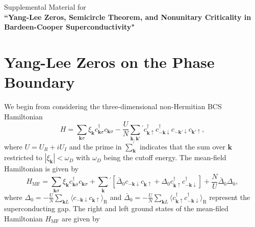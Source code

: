 \documentclass[aps,prl,twocolumn,superscriptaddress]{revtex4-1}
\begin{document}
\begin{bibunit}

\clearpage{}

\onecolumngrid
\appendix
\renewcommand{\thefigure}{S\arabic{figure}}
\setcounter{figure}{0} 
\renewcommand{\thepage}{S\arabic{page}}
\setcounter{page}{1} 
\renewcommand{\theequation}{S.\arabic{equation}}
\setcounter{equation}{0} 
\renewcommand{\thesection}{S\arabic{section}}
\setcounter{section}{0}
\begin{center}
	\large{Supplemental Material for}\\
	\textbf{``Yang-Lee Zeros, Semicircle Theorem, and Nonunitary Criticality in Bardeen-Cooper Superconductivity"}
\end{center}

\tableofcontents{}
\section{Yang-Lee Zeros on the Phase Boundary}
We begin from considering the three-dimensional non-Hermitian BCS Hamiltonian
\begin{equation}
	H=\sum_{\boldsymbol{k}\sigma}\xi_{\boldsymbol{k}}c_{\boldsymbol{k}\sigma}^{\dagger}c_{\boldsymbol{k}\sigma}-\frac{U}{N}\sum_{\bm{k},\bm{k}'}{}^{'}c_{\bm{k}\uparrow}^{\dagger}c_{\bm{-k}\downarrow}^{\dagger}c_{\bm{-k}'\downarrow}c_{\bm{k}'\uparrow}, \label{eq:non-Hermitian}
\end{equation}
where $U=U_R+iU_I$ and the prime in $\sum_{\bm{k}}^{'}$ indicates that the sum over $\bm{k}$ restricted to  $|\xi_{\boldsymbol{k}}|<\omega_D$ with $\omega_D$ being the cutoff energy. The mean-field Hamiltonian is given by 
\begin{equation}
	H_{\mathrm{MF}}=\sum_{\boldsymbol{k}\sigma}\xi_{\boldsymbol{k}}c_{\boldsymbol{k}\sigma}^{\dagger}c_{\boldsymbol{k}\sigma}+\sum_{\bm{k}}{}^{'}[\bar{\Delta}_0c_{-\bm{k}\downarrow}c_{\bm{k}\uparrow}+\Delta_0 c_{\bm{k}\uparrow}^{\dagger}c_{-\bm{k}\downarrow}^{\dagger}]+\frac{N}{U}\bar{\Delta}_{0}\Delta_{0},
\end{equation}
where $\Delta_{0}=-\frac{U}{N}\sum_{\boldsymbol{k}L}\langle c_{-\boldsymbol{k}\downarrow}c_{\boldsymbol{k}\uparrow}\rangle_{\mathrm{R}}$ and $\bar{\Delta}_0=-\frac{U}{N}\sum_{\boldsymbol{k}L}\langle c^{\dagger}_{\boldsymbol{k}\uparrow}c^{\dagger}_{-\boldsymbol{k}\downarrow}\rangle_{\mathrm{R}}$ represent the superconducting gap. The right and left ground states of the mean-filed Hamiltonian $H_{\mathrm{MF}}$ are given by \cite{Yamamoto2019}
\begin{align}

\end{align}
\end{bibunit}
\end{document}

